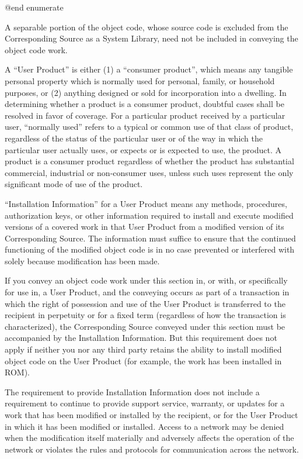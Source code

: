 @end enumerate

A separable portion of the object code, whose source code is excluded
from the Corresponding Source as a System Library, need not be
included in conveying the object code work.

A ``User Product'' is either (1) a ``consumer product'', which means any
tangible personal property which is normally used for personal,
family, or household purposes, or (2) anything designed or sold for
incorporation into a dwelling.  In determining whether a product is a
consumer product, doubtful cases shall be resolved in favor of
coverage.  For a particular product received by a particular user,
``normally used'' refers to a typical or common use of that class of
product, regardless of the status of the particular user or of the way
in which the particular user actually uses, or expects or is expected
to use, the product.  A product is a consumer product regardless of
whether the product has substantial commercial, industrial or
non-consumer uses, unless such uses represent the only significant
mode of use of the product.

``Installation Information'' for a User Product means any methods,
procedures, authorization keys, or other information required to
install and execute modified versions of a covered work in that User
Product from a modified version of its Corresponding Source.  The
information must suffice to ensure that the continued functioning of
the modified object code is in no case prevented or interfered with
solely because modification has been made.

If you convey an object code work under this section in, or with, or
specifically for use in, a User Product, and the conveying occurs as
part of a transaction in which the right of possession and use of the
User Product is transferred to the recipient in perpetuity or for a
fixed term (regardless of how the transaction is characterized), the
Corresponding Source conveyed under this section must be accompanied
by the Installation Information.  But this requirement does not apply
if neither you nor any third party retains the ability to install
modified object code on the User Product (for example, the work has
been installed in ROM).

The requirement to provide Installation Information does not include a
requirement to continue to provide support service, warranty, or
updates for a work that has been modified or installed by the
recipient, or for the User Product in which it has been modified or
installed.  Access to a network may be denied when the modification
itself materially and adversely affects the operation of the network
or violates the rules and protocols for communication across the
network.

